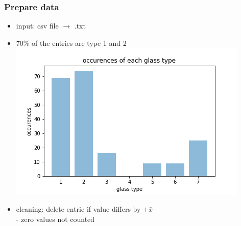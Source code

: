 \documentclass{beamer}
\begin{document}
\begin{frame}
\frametitle{Prepare data}
\begin{itemize}
\item{input: csv file $\rightarrow$ .txt}
\item{70\% of the entries are type 1 and 2 \\
\includegraphics[scale=0.35]{count.png}}
\item{cleaning: delete entrie if value differs by $\pm \bar{x}$\\
- zero values not counted}
\end{itemize}
\end{frame}
\end{document}
